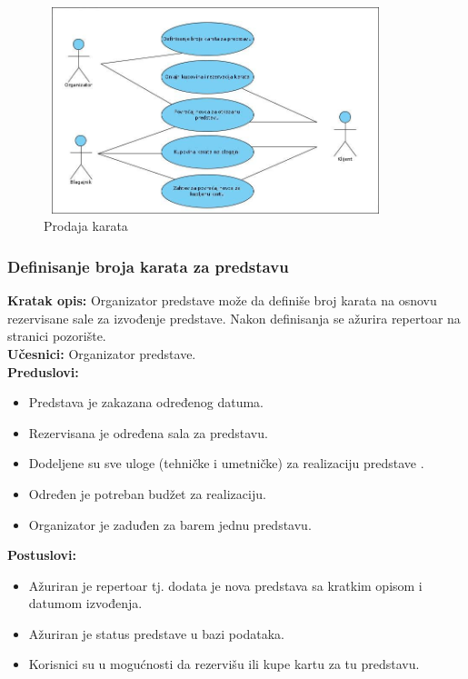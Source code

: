 \documentclass[a4paper]{article}
\begin{document}
\begin{figure}[H]
  \begin{center}
      \includegraphics[width=100mm,height=60mm]{../diagrams/usecase_prodaja_karata.jpg}
  \end{center}
  \caption{Prodaja karata}
  \label{usecase_prodaja_karata}
\end{figure}

\subsubsection{Definisanje broja karata za predstavu}
\noindent\textbf{Kratak opis:} Organizator predstave može da definiše broj karata na osnovu rezervisane
sale za izvođenje predstave. Nakon definisanja se ažurira repertoar na stranici pozorište.\\

\noindent\textbf{Učesnici:} Organizator predstave.\\

\noindent\textbf{Preduslovi:}
  \begin{itemize}
    \item Predstava je zakazana određenog datuma.
    \item Rezervisana je određena sala za predstavu.
    \item Dodeljene su sve uloge (tehničke i umetničke) za realizaciju predstave .
    \item Određen je potreban budžet za realizaciju.
    \item Organizator je zaduđen za barem jednu predstavu.
  \end{itemize}

\noindent\textbf{Postuslovi:} 
  \begin{itemize}
    \item Ažuriran je repertoar tj. dodata je nova predstava sa kratkim opisom i datumom izvođenja.
    \item Ažuriran je status predstave u bazi podataka.
    \item Korisnici su u mogućnosti da rezervišu ili kupe kartu za tu predstavu.
  \end{itemize}
\end{document}
